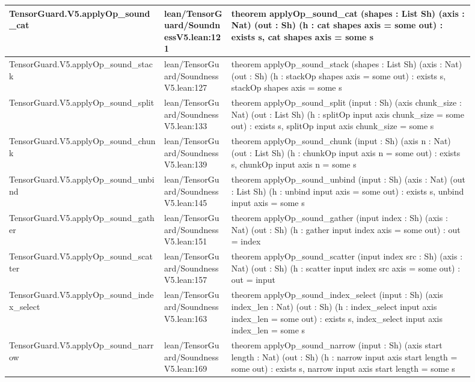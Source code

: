 \documentclass[10pt]{article}
\begin{document}
\begin{longtable}{|p{0.30\linewidth}|p{0.13\linewidth}|p{0.47\linewidth}|}
\hline
TensorGuard.V5.applyOp\_sound\_cat & lean/TensorGuard/SoundnessV5.lean:121 & theorem applyOp\_sound\_cat (shapes : List Sh) (axis : Nat) (out : Sh) (h : cat shapes axis = some out) : exists s, cat shapes axis = some s \\
\hline
TensorGuard.V5.applyOp\_sound\_stack & lean/TensorGuard/SoundnessV5.lean:127 & theorem applyOp\_sound\_stack (shapes : List Sh) (axis : Nat) (out : Sh) (h : stackOp shapes axis = some out) : exists s, stackOp shapes axis = some s \\
\hline
TensorGuard.V5.applyOp\_sound\_split & lean/TensorGuard/SoundnessV5.lean:133 & theorem applyOp\_sound\_split (input : Sh) (axis chunk\_size : Nat) (out : List Sh) (h : splitOp input axis chunk\_size = some out) : exists s, splitOp input axis chunk\_size = some s \\
\hline
TensorGuard.V5.applyOp\_sound\_chunk & lean/TensorGuard/SoundnessV5.lean:139 & theorem applyOp\_sound\_chunk (input : Sh) (axis n : Nat) (out : List Sh) (h : chunkOp input axis n = some out) : exists s, chunkOp input axis n = some s \\
\hline
TensorGuard.V5.applyOp\_sound\_unbind & lean/TensorGuard/SoundnessV5.lean:145 & theorem applyOp\_sound\_unbind (input : Sh) (axis : Nat) (out : List Sh) (h : unbind input axis = some out) : exists s, unbind input axis = some s \\
\hline
TensorGuard.V5.applyOp\_sound\_gather & lean/TensorGuard/SoundnessV5.lean:151 & theorem applyOp\_sound\_gather (input index : Sh) (axis : Nat) (out : Sh) (h : gather input index axis = some out) : out = index \\
\hline
TensorGuard.V5.applyOp\_sound\_scatter & lean/TensorGuard/SoundnessV5.lean:157 & theorem applyOp\_sound\_scatter (input index src : Sh) (axis : Nat) (out : Sh) (h : scatter input index src axis = some out) : out = input \\
\hline
TensorGuard.V5.applyOp\_sound\_index\_select & lean/TensorGuard/SoundnessV5.lean:163 & theorem applyOp\_sound\_index\_select (input : Sh) (axis index\_len : Nat) (out : Sh) (h : index\_select input axis index\_len = some out) : exists s, index\_select input axis index\_len = some s \\
\hline
TensorGuard.V5.applyOp\_sound\_narrow & lean/TensorGuard/SoundnessV5.lean:169 & theorem applyOp\_sound\_narrow (input : Sh) (axis start length : Nat) (out : Sh) (h : narrow input axis start length = some out) : exists s, narrow input axis start length = some s \\
\hline

\end{longtable}
\end{document}
